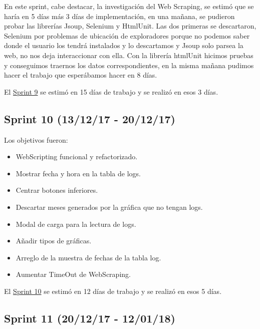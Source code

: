 En este sprint, cabe destacar, la investigación del Web Scraping, se estimó que se haría en 5 días más 3 días de implementación, en una mañana, se pudieron probar las librerías Jsoup, Selenium y HtmlUnit. Las dos primeras se descartaron, Selenium por problemas de ubicación de exploradores porque no podemos saber donde el usuario los tendrá instalados y lo descartamos y Jsoup solo parsea la web, no nos deja interaccionar con ella. Con la librería htmlUnit hicimos pruebas y conseguimos traernos los datos correspondientes, en la misma mañana pudimos hacer el trabajo que esperábamos hacer en 8 días.

El \href{https://github.com/trona85/GII-17.1B-UBULog-1.0/milestone/9?closed=1}{Sprint 9} se estimó en 15 días de trabajo y se realizó en esos 3 días.


\subsection{Sprint 10 (13/12/17 -
	20/12/17)}\label{sprint-10-131217---201217}

Los objetivos fueron:
\begin{itemize}
	\tightlist
	\item
	WebScripting funcional y refactorizado.
	\item
	Mostrar fecha y hora en la tabla de logs.
	\item
	Centrar botones inferiores.
	\item
	Descartar meses generados por la gráfica que no tengan logs.
	\item
	Modal de carga para la lectura de logs.
	\item
	Añadir tipos de gráficas.
	\item
	Arreglo de la muestra de fechas de la tabla log.
	\item
	Aumentar TimeOut de WebScraping.
	
\end{itemize}

El \href{https://github.com/trona85/GII-17.1B-UBULog-1.0/milestone/10?closed=1}{Sprint 10} se estimó en 12 días de trabajo y se realizó en esos 5 días.


\subsection{Sprint 11 (20/12/17 -
	12/01/18)}\label{sprint-11-201217---120118}

